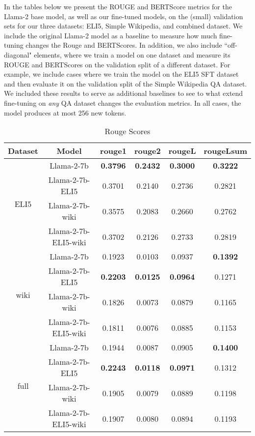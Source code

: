 \documentclass[11pt, oneside]{article}   	%
\begin{document}
In the tables below we present the ROUGE and BERTScore metrics for the Llama-2 base model, as well as our fine-tuned models, on the (small) validation sets for our three datasets: ELI5, Simple Wikipedia, and combined dataset.
We include the original Llama-2 model as a baseline to measure how much fine-tuning changes the Rouge and BERTScores.
In addition, we also include ``off-diagonal" elements, where we train a model on one dataset and measure its ROUGE and BERTScores on the validation split of a different dataset.
For example, we include cases where we train the model on the ELI5 SFT dataset and then evaluate it on the validation split of the Simple Wikipedia QA dataset.
We included these results to serve as additional baselines to see to what extend fine-tuning on \textit{any} QA dataset changes the evaluation metrics.
In all cases, the model produces at most 256 new tokens.

\begin{table}[htbp]
\centering
\begin{tabular}{cccccc}
\toprule
\textbf{Dataset} & \textbf{Model} & \textbf{rouge1} & \textbf{rouge2} & \textbf{rougeL} & \textbf{rougeLsum} \\
\midrule
\multirow{4}{*}{ELI5} & Llama-2-7b & \textbf{0.3796} & \textbf{0.2432} & \textbf{0.3000} & \textbf{0.3222} \\
& Llama-2-7b-ELI5 & 0.3701 & 0.2140 & 0.2736 & 0.2821 \\
& Llama-2-7b-wiki & 0.3575 & 0.2083 & 0.2660 & 0.2762 \\
& Llama-2-7b-ELI5-wiki & 0.3702 & 0.2126 & 0.2733 & 0.2819 \\
\midrule
\multirow{4}{*}{wiki} & Llama-2-7b & 0.1923 & 0.0103 & 0.0937 & \textbf{0.1392} \\
& Llama-2-7b-ELI5 & \textbf{0.2203} & \textbf{0.0125} & \textbf{0.0964} & 0.1271 \\
& Llama-2-7b-wiki & 0.1826 & 0.0073 & 0.0879 & 0.1165 \\
& Llama-2-7b-ELI5-wiki & 0.1811 & 0.0076 & 0.0885 & 0.1153 \\
\midrule
\multirow{4}{*}{full} & Llama-2-7b & 0.1944 & 0.0087 & 0.0905 & \textbf{0.1400} \\
& Llama-2-7b-ELI5 & \textbf{0.2243} & \textbf{0.0118} & \textbf{0.0971} & 0.1312 \\
& Llama-2-7b-wiki & 0.1905 & 0.0079 & 0.0889 & 0.1198 \\
&Llama-2-7b-ELI5-wiki & 0.1907 & 0.0080 & 0.0894 & 0.1193 \\
\bottomrule
\end{tabular}
\caption{Rouge Scores}
\label{tab:rouge_scores}
\end{table}
\end{document}
